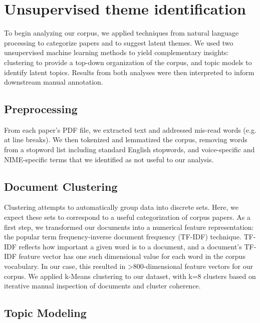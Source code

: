 \documentclass[sigconf]{nimeart}
\begin{document}
\section{\texorpdfstring{\textbf{Unsupervised theme identification}}{Unsupervised theme identification}}\label{unsupervised-theme-identification}

To begin analyzing our corpus, we applied techniques from natural language processing to categorize papers and to suggest latent themes. We used two unsupervised machine learning methods to yield complementary insights: clustering to provide a top-down organization of the corpus, and topic models to identify latent topics. Results from both analyses were then interpreted to inform downstream manual annotation.

\subsection{Preprocessing}\label{preprocessing}

From each paper's PDF file, we extracted text and addressed mis-read words (e.g. at line breaks). We then tokenized and lemmatized the corpus, removing words from a stopword list including standard English stopwords, and voice-specific and NIME-specific terms that we identified as not useful to our analysis.

\subsection{Document Clustering}\label{document-clustering}

Clustering attempts to automatically group data into discrete sets. Here, we expect these sets to correspond to a useful categorization of corpus papers. As a first step, we transformed our documents into a numerical feature representation: the popular term frequency-inverse document frequency (TF-IDF) technique. TF-IDF reflects how important a given word is to a document, and a document's TF-IDF feature vector has one such dimensional value for each word in the corpus vocabulary. In our case, this resulted in \textgreater800-dimensional feature vectors for our corpus. We applied k-Means clustering to our dataset, with k=8 clusters based on iterative manual inspection of documents and cluster coherence.

\subsection{Topic Modeling}\label{topic-modeling}
\end{document}

